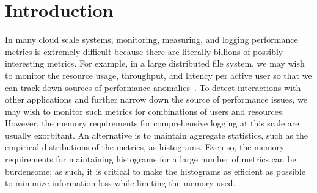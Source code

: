 \documentclass[preprint]{sig-alternate-per}
\begin{document}
\begin{abstract}




\end{abstract}

\section{Introduction}

In many cloud scale systems, monitoring, measuring, and logging
performance metrics is extremely difficult because there are literally
billions of possibly interesting metrics. For example, in a large
distributed file system, we may wish to monitor the resource usage,
throughput, and latency per active user so that we can track down
sources of performance anomalies~\cite{tailscale}. To detect
interactions with other applications and further narrow down the
source of performance issues, we may wish to monitor such metrics for
combinations of users and resources.  However, the memory requirements
for comprehensive logging at this scale are usually exorbitant. An
alternative is to maintain aggregate statistics, such as the empirical
distributions of the metrics, as histograms. Even so, the memory
requirements for maintaining histograms for a large number of metrics
can be burdensome; as such, it is critical to make the histograms as
efficient as possible to minimize information loss while limiting the
memory used.
\end{document}
